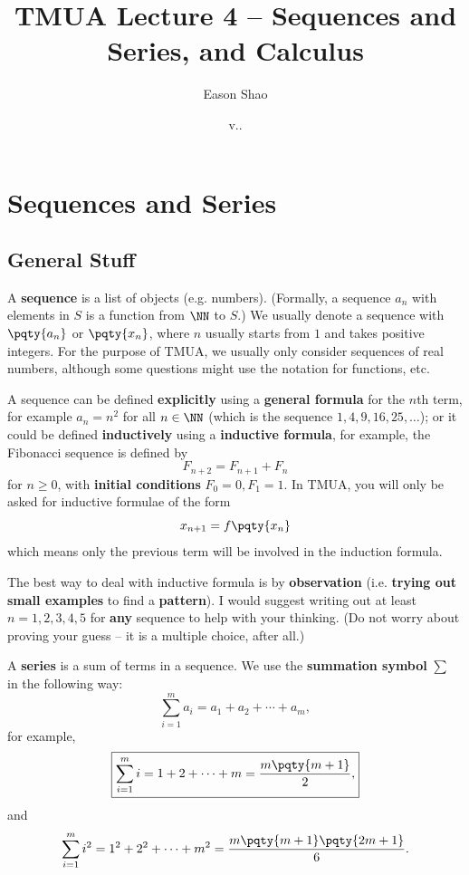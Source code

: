\documentclass{article}
\title{TMUA Lecture 4 -- Sequences and Series, and Calculus}
\author{Eason Shao}
\date{v.\DATE.\COMMITSHA}
\begin{document}
\maketitle

\tableofcontents

\section{Sequences and Series}

\subsection{General Stuff}

A \textbf{sequence} is a list of objects (e.g. numbers). (Formally, a sequence \(a_n\) with elements in \(S\) is a function from \(\NN\) to \(S\).) We usually denote a sequence with \(\pqty{a_n}\) or \(\pqty{x_n}\), where \(n\) usually starts from \(1\) and takes positive integers. For the purpose of TMUA, we usually only consider sequences of real numbers, although some questions might use the notation for functions, etc.

A sequence can be defined \textbf{explicitly} using a \textbf{general formula} for the \(n\)th term, for example \(a_n = n^2\) for all \(n \in \NN\) (which is the sequence \(1, 4, 9, 16, 25, \ldots\)); or it could be defined \textbf{inductively} using a \textbf{inductive formula}, for example, the Fibonacci sequence is defined by
\[
    F_{n + 2} = F_{n + 1} + F_n
\]
for \(n \geq 0\), with \textbf{initial conditions} \(F_0 = 0, F_1 = 1\). In TMUA, you will only be asked for inductive formulae of the form
\[
    x_{n + 1} = f\pqty{x_n}
\]
which means only the previous term will be involved in the induction formula.

The best way to deal with inductive formula is by \textbf{observation} (i.e. \textbf{trying out small examples} to find a \textbf{pattern}). I would suggest writing out at least \(n = 1, 2, 3, 4, 5\) for \textbf{any} sequence to help with your thinking. (Do not worry about proving your guess -- it is a multiple choice, after all.)

A \textbf{series} is a sum of terms in a sequence. We use the \textbf{summation symbol} \(\sum\) in the following way:
\[
    \sum_{i = 1}^{m} a_i = a_1 + a_2 + \cdots + a_m,
\]
for example,
\[
    \boxed{\sum_{i = 1}^{m} i = 1 + 2 + \cdots + m = \frac{m \pqty{m + 1}}{2},}
\]
and
\[
    \sum_{i = 1}^{m} i^2 = 1^2 + 2^2 + \cdots + m^2 = \frac{m \pqty{m + 1} \pqty{2m + 1}}{6}.
\]
\end{document}
